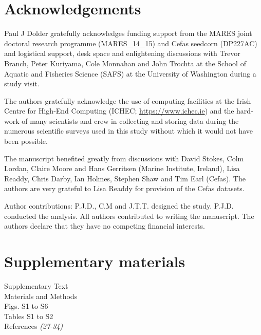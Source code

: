 \documentclass[12pt]{article}
\begin{document}




\newpage

\section*{Acknowledgements}

Paul J Dolder gratefully acknowledges funding support from the MARES joint
doctoral research programme (MARES\_14\_15) and Cefas seedcorn (DP227AC) and
logistical support, desk space and enlightening discussions with Trevor Branch,
Peter Kuriyama, Cole Monnahan and John Trochta at the School of Aquatic and
Fisheries Science (SAFS) at the University of Washington during a study visit.

The authors gratefully acknowledge the use of computing facilities at the Irish
Centre for High-End Computing (ICHEC; \url{https://www.ichec.ie}) and the
hard-work of many scientists and crew in collecting and storing data during the
numerous scientific surveys used in this study without which it would not have
been possible.  
	 
The manuscript benefited greatly from discussions with David Stokes, Colm
Lordan, Claire Moore and Hans Gerritsen (Marine Institute, Ireland), Lisa
Readdy, Chris Darby, Ian Holmes, Stephen Shaw and Tim Earl (Cefas).  The
authors are very grateful to Lisa Readdy for provision of the Cefas datasets.

Author contributions: P.J.D., C.M and J.T.T. designed the study. P.J.D.
conducted the analysis. All authors contributed to writing the manuscript. The
authors declare that they have no competing financial interests.


\section*{Supplementary materials}
Supplementary Text \\
Materials and Methods\\
Figs. S1 to S6\\
Tables S1 to S2\\
References \textit{(27-34)}


\end{document}
